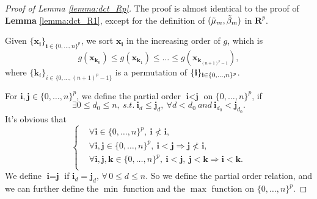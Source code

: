 \documentclass[nohyperref]{article}
\theoremstyle{plain}
\begin{document}
\begin{proof}[Proof of Lemma \ref{lemma:dct_Rp}]

The proof is almost identical to the proof of \textbf{Lemma} \ref{lemma:dct_R1}, except for the definition of $(\Tilde{\mu}_m, \Tilde{\beta}_m)$ in $\textbf{R}^p$.


Given $\{\textbf{x}_{\textbf{i}}\}_{\textbf{i} \in \{0,\dots,n\}^p}$, we sort $\textbf{x}_{\textbf{i}}$ in the increasing order of $g$, which is 
$$
g(\textbf{x}_{\textbf{k}_0}) \leq g(\textbf{x}_{\textbf{k}_1}) \leq \dots \leq g(\textbf{x}_{\textbf{k}_{(n+1)^p - 1}}),
$$
where $\{\textbf{k}_i\}_{i \in \{0, \dots, (n+1)^p - 1\}}$ is a permutation of $\{\textbf{\textbf{i}}\}_{\textbf{i} \in \{0, \dots, n\}^p}$.

For $\textbf{i}, \textbf{j} \in \{0, \dots, n\}^p$, we define the partial order $\textbf{i} < \textbf{j}$ on $\{0, \dots, n\}^p$, if 
$$
\exists 0 \leq d_0 \leq n,\  s.t.\  \textbf{i}_d \leq \textbf{j}_d,\ \forall d < d_0 \ and\  \textbf{i}_{d_0} < \textbf{j}_{d_0}.
$$
It's obvious that 
\begin{equation*}
    \left\{
    \begin{aligned}
        &\forall \textbf{i} \in \{0, \dots, n\}^p,\  \textbf{i} \nless \textbf{i}, \\
        &\forall \textbf{i}, \textbf{j} \in \{0, \dots, n\}^p,\ \textbf{i} < \textbf{j} \Rightarrow \textbf{j} \nless \textbf{i}, \\
        &\forall \textbf{i}, \textbf{j}, \textbf{k} \in \{0, \dots, n\}^p,\ \textbf{i} < \textbf{j},\  \textbf{j} < \textbf{k} \Rightarrow \textbf{i} < \textbf{k}. \\
    \end{aligned}
    \right.
\end{equation*}
We define $\textbf{i} = \textbf{j}$ if $\textbf{i}_d = \textbf{j}_d,\, \forall\, 0 \leq d \leq n$.
So we define the partial order relation, and we can further define the $\min$ function and the $\max$ function on $\{0, \dots, n\}^p$.


\end{proof}
\end{document}
